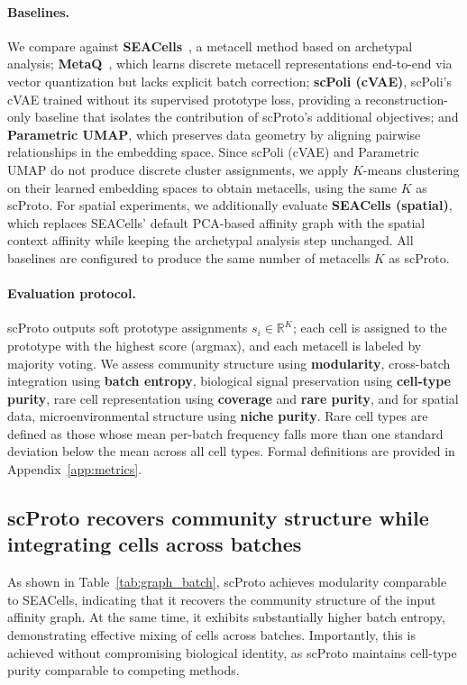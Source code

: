 \paragraph{Baselines.}
We compare against \textbf{SEACells}~\citep{seacells}, a metacell method based on archetypal analysis;
\textbf{MetaQ}~\citep{metaq}, which learns discrete metacell representations end-to-end via vector quantization but lacks explicit batch correction;
\textbf{scPoli (cVAE)}, scPoli's cVAE trained without its supervised prototype loss, providing a reconstruction-only baseline that isolates the contribution of scProto's additional objectives;
and \textbf{Parametric UMAP}, which preserves data geometry by aligning pairwise relationships in the embedding space.
Since scPoli (cVAE) and Parametric UMAP do not produce discrete cluster assignments, we apply $K$-means clustering on their learned embedding spaces to obtain metacells, using the same $K$ as scProto.
For spatial experiments, we additionally evaluate \textbf{SEACells (spatial)}, which replaces SEACells' default PCA-based affinity graph with the spatial context affinity while keeping the archetypal analysis step unchanged.
All baselines are configured to produce the same number of metacells $K$ as scProto.

\paragraph{Evaluation protocol.}
scProto outputs soft prototype assignments $s_i \in \mathbb{R}^K$; each cell is assigned to the prototype with the highest score (argmax), and each metacell is labeled by majority voting.
We assess community structure using \textbf{modularity}, cross-batch integration using \textbf{batch entropy}, biological signal preservation using \textbf{cell-type purity}, rare cell representation using \textbf{coverage} and \textbf{rare purity}, and for spatial data, microenvironmental structure using \textbf{niche purity}.
Rare cell types are defined as those whose mean per-batch frequency falls more than one standard deviation below the mean across all cell types.
Formal definitions are provided in Appendix~\ref{app:metrics}.

\subsection{scProto recovers community structure while integrating cells across batches}

As shown in Table~\ref{tab:graph_batch}, scProto achieves modularity comparable to SEACells, indicating that it recovers the community structure of the input affinity graph. At the same time, it exhibits substantially higher batch entropy, demonstrating effective mixing of cells across batches. Importantly, this is achieved without compromising biological identity, as scProto maintains cell-type purity comparable to competing methods.

